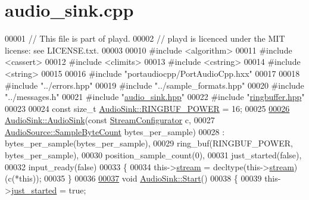 \hypertarget{audio__sink_8cpp_source}{\section{audio\+\_\+sink.\+cpp}
\label{audio__sink_8cpp_source}
}

\begin{DoxyCode}
00001 \textcolor{comment}{// This file is part of playd.}
00002 \textcolor{comment}{// playd is licenced under the MIT license: see LICENSE.txt.}
00003 
00010 \textcolor{preprocessor}{#include <algorithm>}
00011 \textcolor{preprocessor}{#include <cassert>}
00012 \textcolor{preprocessor}{#include <climits>}
00013 \textcolor{preprocessor}{#include <cstring>}
00014 \textcolor{preprocessor}{#include <string>}
00015 
00016 \textcolor{preprocessor}{#include "portaudiocpp/PortAudioCpp.hxx"}
00017 
00018 \textcolor{preprocessor}{#include "../errors.hpp"}
00019 \textcolor{preprocessor}{#include "../sample\_formats.hpp"}
00020 \textcolor{preprocessor}{#include "../messages.h"}
00021 \textcolor{preprocessor}{#include "\hyperlink{audio__sink_8hpp}{audio\_sink.hpp}"}
00022 \textcolor{preprocessor}{#include "\hyperlink{ringbuffer_8hpp}{ringbuffer.hpp}"}
00023 
00024 \textcolor{keyword}{const} \textcolor{keywordtype}{size\_t} \hyperlink{classAudioSink_a152e5a388d4570211509a2a19a38c321}{AudioSink::RINGBUF\_POWER} = 16;
00025 
\hypertarget{audio__sink_8cpp_source_l00026}{}\hyperlink{classAudioSink_ab4adf46e3e93d35e2b5fb1ab0e75793b}{00026} \hyperlink{classAudioSink_ab4adf46e3e93d35e2b5fb1ab0e75793b}{AudioSink::AudioSink}(\textcolor{keyword}{const} \hyperlink{classAudioSink_ae5b8370aa17c24c6fc8f8e0c5778168c}{StreamConfigurator} c,
00027                      \hyperlink{classAudioSource_a1c8138ec9ffb9fd1394d0ad0782d60fa}{AudioSource::SampleByteCount} bytes\_per\_sample)
00028     : bytes\_per\_sample(bytes\_per\_sample),
00029       ring\_buf(RINGBUF\_POWER, bytes\_per\_sample),
00030       position\_sample\_count(0),
00031       just\_started(false),
00032       input\_ready(false)
00033 \{
00034     this->\hyperlink{classAudioSink_aac90e7d95e98ac08b7c661a301eff1b2}{stream} = decltype(this->\hyperlink{classAudioSink_aac90e7d95e98ac08b7c661a301eff1b2}{stream})(c(*\textcolor{keyword}{this}));
00035 \}
00036 
\hypertarget{audio__sink_8cpp_source_l00037}{}\hyperlink{classAudioSink_a18196e0dec3b4d58e17c454379ed0728}{00037} \textcolor{keywordtype}{void} \hyperlink{classAudioSink_a18196e0dec3b4d58e17c454379ed0728}{AudioSink::Start}()
00038 \{
00039     this->\hyperlink{classAudioSink_a00cbaaf2b4fcf5d9acb614b909234196}{just\_started} = \textcolor{keyword}{true};

\end{DoxyCode}
